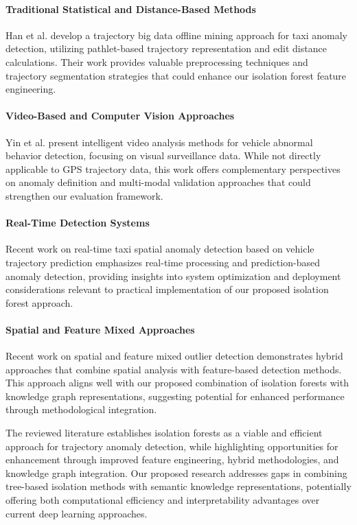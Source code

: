 \documentclass[runningheads]{llncs}
\begin{document}
\paragraph{Traditional Statistical and Distance-Based Methods}
Han et al. \cite{han2016anomaly} develop a trajectory big data offline mining approach for taxi anomaly detection, utilizing pathlet-based trajectory representation and edit distance calculations. Their work provides valuable preprocessing techniques and trajectory segmentation strategies that could enhance our isolation forest feature engineering.

\paragraph{Video-Based and Computer Vision Approaches}
Yin et al. \cite{yin2014intelligent} present intelligent video analysis methods for vehicle abnormal behavior detection, focusing on visual surveillance data. While not directly applicable to GPS trajectory data, this work offers complementary perspectives on anomaly definition and multi-modal validation approaches that could strengthen our evaluation framework.

\paragraph{Real-Time Detection Systems}
Recent work \cite{hu2024realtime} on real-time taxi spatial anomaly detection based on vehicle trajectory prediction emphasizes real-time processing and prediction-based anomaly detection, providing insights into system optimization and deployment considerations relevant to practical implementation of our proposed isolation forest approach.

\paragraph{Spatial and Feature Mixed Approaches}
Recent work \cite{safety2024spatial} on spatial and feature mixed outlier detection demonstrates hybrid approaches that combine spatial analysis with feature-based detection methods. This approach aligns well with our proposed combination of isolation forests with knowledge graph representations, suggesting potential for enhanced performance through methodological integration.

The reviewed literature establishes isolation forests as a viable and efficient approach for trajectory anomaly detection, while highlighting opportunities for enhancement through improved feature engineering, hybrid methodologies, and knowledge graph integration. Our proposed research addresses gaps in combining tree-based isolation methods with semantic knowledge representations, potentially offering both computational efficiency and interpretability advantages over current deep learning approaches.
\end{document}
